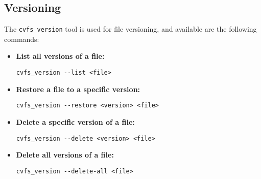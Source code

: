 \subsection*{Versioning}

The \texttt{cvfs\_version} tool is used for file versioning, and available are the following commands:

\begin{itemize}
    \setlength\itemsep{-0.1em}
    \item \textbf{List all versions of a file:} \\
    \begin{BVerbatim}[baseline=t,boxwidth=10cm]
  cvfs_version --list <file>
    \end{BVerbatim}

    \item \textbf{Restore a file to a specific version:} \\
    \begin{BVerbatim}[baseline=t,boxwidth=10cm]
  cvfs_version --restore <version> <file>
    \end{BVerbatim}

    \item \textbf{Delete a specific version of a file:} \\
    \begin{BVerbatim}[baseline=t,boxwidth=10cm]
  cvfs_version --delete <version> <file>
    \end{BVerbatim}

    \item \textbf{Delete all versions of a file:} \\
    \begin{BVerbatim}[baseline=t,boxwidth=10cm]
  cvfs_version --delete-all <file>
    \end{BVerbatim}
\end{itemize}
